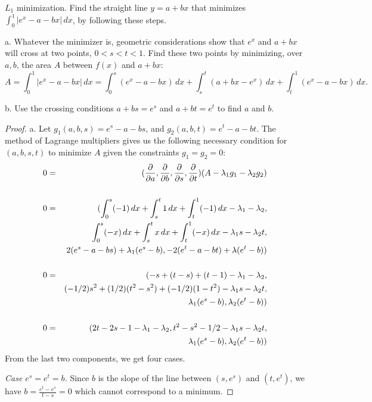 \documentclass{article}
\begin{document}
 $L_1$ minimization. Find the straight line $y = a + bx$ that minimizes  $\int_0^1|e^x − a − bx| \, dx$, by following these steps.

a. Whatever the minimizer is, geometric considerations show that $e^x$ and $a+bx$ will cross at two points, $0 < s < t < 1$. Find these two points by minimizing, over $a,b$, the area $A$ between $f(x)$ and $a+bx$:
$$A=\int_0^1 |e^x − a −bx| \, dx = \int_0^s (e^x − a −bx)\,dx + \int_s^t (a+bx−e^x) \,dx +  \int_t^1(e^x − a − bx) \,dx.$$

b. Use the crossing conditions $a + bs = e^s$ and $a + bt = e^t$ to find $a$ and $b$.

\begin{proof}

a. Let $g_1(a,b,s) = e^s - a - bs$, and $g_2(a,b,t) = e^t - a - bt$.
The method of Lagrange multipliers gives us the following necessary condition for $(a,b,s,t)$ to minimize $A$ given the constraints $g_1 = g_2 = 0$:
\begin{align}
 0      & = & (\frac{\partial}{\partial a}, \frac{\partial}{\partial b}, \frac{\partial}{\partial s}, \frac{\partial}{\partial t}) (A - \lambda_1 g_1 - \lambda_2 g_2) \nonumber
\\ \nonumber
\\ 0     & = & ( \int_0^s  (-1) \,dx + \int_s^t 1 \,dx + \int_t^1 (-1) \, dx  - \lambda_1 - \lambda_2 , \nonumber
\\ & &                \int_0^s  (-x) \,dx + \int_s^t x \,dx + \int_t^1 (-x) \, dx  - \lambda_1 s - \lambda_2 t, \nonumber
\\ & &           2(e^s - a -bs)  + \lambda_1(e^s - b),
                - 2(e^t - a - bt) + \lambda(e^t - b)) \nonumber
\\ \nonumber
\\  0    & = & ( -s + (t - s) + (t - 1) - \lambda_1 - \lambda_2, \nonumber
\\ & &            (-1/2)s^2  + (1/2)(t^2 - s^2)  + (-1/2) (1 - t^2) - \lambda_1 s - \lambda_2 t, \nonumber
\\ & &          \lambda_1(e^s - b),
                \lambda_2(e^t - b)) \nonumber
\\ \nonumber
\\ 0    & = & ( 2t - 2s - 1 - \lambda_1 - \lambda_2, t^2 - s^2 - 1/2  - \lambda_1 s - \lambda_2 t, \nonumber
\\ & &  \lambda_1(e^s - b), \lambda_2(e^t - b) ) \label{eq1}
\end{align}
From the last two components, we get four cases.

\emph{Case $e^s = e^t = b$.} Since $b$ is the slope of the line between $(s, e^s)$ and $(t, e^t)$, we have $b = \frac {e^t - e^s}{t - s} = 0$ which cannot correspond to a minimum.


\end{proof}
\end{document}
